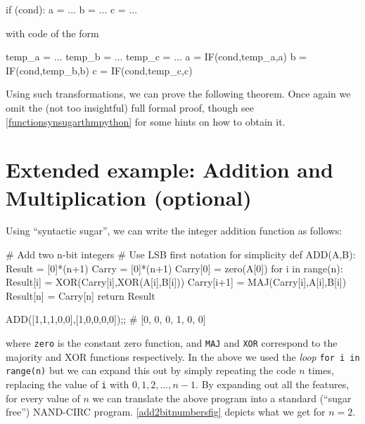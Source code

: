 \begin{code}
if (cond):
    a = ...
    b = ...
    c = ...
\end{code}

with code of the form

\begin{code}
temp_a = ...
temp_b = ...
temp_c = ...
a = IF(cond,temp_a,a)
b = IF(cond,temp_b,b)
c = IF(cond,temp_c,c)
\end{code}

Using such transformations, we can prove the following theorem. Once
again we omit the (not too insightful) full formal proof, though see
\cref{functionsynsugarthmpython} for some hints on how to obtain it.

\hypertarget{conditionalsugarthm}{}

\section{Extended example: Addition and Multiplication
(optional)}\label{addexample}

Using ``syntactic sugar'', we can write the integer addition function as
follows:

\begin{code}
# Add two n-bit integers
# Use LSB first notation for simplicity
def ADD(A,B):
    Result = [0]*(n+1)
    Carry  = [0]*(n+1)
    Carry[0] = zero(A[0])
    for i in range(n):
        Result[i] = XOR(Carry[i],XOR(A[i],B[i]))
        Carry[i+1] = MAJ(Carry[i],A[i],B[i])
    Result[n] = Carry[n]
    return Result

ADD([1,1,1,0,0],[1,0,0,0,0]);;
# [0, 0, 0, 1, 0, 0]
\end{code}

where \texttt{zero} is the constant zero function, and \texttt{MAJ} and
\texttt{XOR} correspond to the majority and XOR functions respectively.
In the above we used the \emph{loop} \texttt{for i in range(n)} but we
can expand this out by simply repeating the code \(n\) times, replacing
the value of \texttt{i} with \(0,1,2,\ldots,n-1\). By expanding out all
the features, for every value of \(n\) we can translate the above
program into a standard (``sugar free'') NAND-CIRC program.
\cref{add2bitnumbersfig} depicts what we get for \(n=2\).


